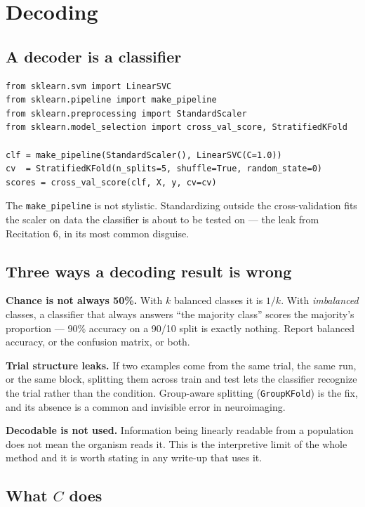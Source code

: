 \documentclass[11pt]{article}
\begin{document}
\section{Decoding}

\subsection{A decoder is a classifier}

\begin{lstlisting}
from sklearn.svm import LinearSVC
from sklearn.pipeline import make_pipeline
from sklearn.preprocessing import StandardScaler
from sklearn.model_selection import cross_val_score, StratifiedKFold

clf = make_pipeline(StandardScaler(), LinearSVC(C=1.0))
cv  = StratifiedKFold(n_splits=5, shuffle=True, random_state=0)
scores = cross_val_score(clf, X, y, cv=cv)
\end{lstlisting}

The \texttt{make\_pipeline} is not stylistic. Standardizing outside the
cross-validation fits the scaler on data the classifier is about to be tested
on --- the leak from Recitation 6, in its most common disguise.

\subsection{Three ways a decoding result is wrong}

\textbf{Chance is not always 50\%.} With $k$ balanced classes it is $1/k$. With
\emph{imbalanced} classes, a classifier that always answers ``the majority
class'' scores the majority's proportion --- 90\% accuracy on a 90/10 split is
exactly nothing. Report balanced accuracy, or the confusion matrix, or both.

\textbf{Trial structure leaks.} If two examples come from the same trial, the
same run, or the same block, splitting them across train and test lets the
classifier recognize the trial rather than the condition. Group-aware splitting
(\texttt{GroupKFold}) is the fix, and its absence is a common and invisible
error in neuroimaging.

\textbf{Decodable is not used.} Information being linearly readable from a
population does not mean the organism reads it. This is the interpretive limit
of the whole method and it is worth stating in any write-up that uses it.

\subsection{What $C$ does}
\end{document}
